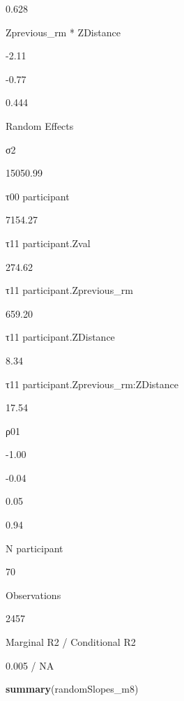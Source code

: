 \documentclass[
]{article}
\newenvironment{Shaded}{\begin{snugshade}}{\end{snugshade}}
\newcommand{\KeywordTok}[1]{\textcolor[rgb]{0.13,0.29,0.53}{\textbf{#1}}}
\newcommand{\NormalTok}[1]{#1}
\begin{document}
0.628

Zprevious\_rm * ZDistance

-2.11

-0.77

0.444

Random Effects

σ2

15050.99

τ00 participant

7154.27

τ11 participant.Zval

274.62

τ11 participant.Zprevious\_rm

659.20

τ11 participant.ZDistance

8.34

τ11 participant.Zprevious\_rm:ZDistance

17.54

ρ01

-1.00

-0.04

0.05

0.94

N participant

70

Observations

2457

Marginal R2 / Conditional R2

0.005 / NA

\begin{Shaded}
\begin{Highlighting}[]
\KeywordTok{summary}\NormalTok{(randomSlopes_m8)}
\end{Highlighting}
\end{Shaded}
\end{document}
